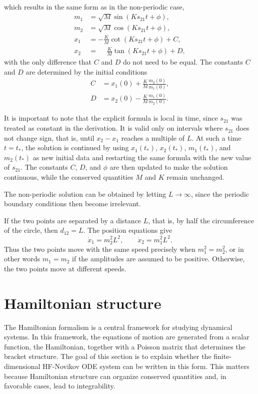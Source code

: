 \documentclass[english,master]{liumaiex}
\theoremstyle{thesisplain}
\theoremstyle{thesisdefinition}
\numberwithin{equation}{section}
\begin{document}
which results in the same form as in the non-periodic case,
\begin{align}
    m_1 &= \sqrt{M} \sin(K s_{21}t + \phi), \\
    m_2 &= \sqrt{M} \cos(K s_{21}t + \phi), \\
    x_1 &= -\frac{K}{M}\cot(Ks_{21}t + \phi) + C,\\
    x_2 &= \phantom{-}\frac{K}{M}\tan(Ks_{21}t + \phi) + D,
\end{align}
with the only difference that $C$ and $D$ do not need to be equal. The constants $C$ and $D$ are determined by the initial conditions
\begin{equation}
\begin{aligned}
    C &= x_1(0) + \frac{K}{M}\frac{m_2(0)}{m_1(0)}, \\
    D &= x_2(0) - \frac{K}{M}\frac{m_1(0)}{m_2(0)}.
\end{aligned}
\end{equation}

It is important to note that the explicit formula is local in time, since $s_{21}$ was treated as constant in the derivation. It is valid only on intervals where $s_{21}$ does not change sign, that is, until $x_2-x_1$ reaches a multiple of $L$. At such a time $t=t_*$, the solution is continued by using $x_1(t_*)$, $x_2(t_*)$, $m_1(t_*)$, and $m_2(t_*)$ as new initial data and restarting the same formula with the new value of $s_{21}$. The constants $C$, $D$, and $\phi$ are then updated to make the solution continuous, while the conserved quantities $M$ and $K$ remain unchanged.

The non-periodic solution can be obtained by letting $L \rightarrow \infty$, since the periodic boundary conditions then become irrelevant.

If the two points are separated by a distance $L$, that is, by half the circumference of the circle, then $d_{12}=L$. The position equations give
\begin{equation}
    \dot{x}_1 = m_2^2L^2, \qquad
    \dot{x}_2 = m_1^2L^2.
\end{equation}
Thus the two points move with the same speed precisely when $m_1^2=m_2^2$, or in other words $m_1=m_2$ if the amplitudes are assumed to be positive. Otherwise, the two points move at different speeds.

\section{Hamiltonian structure} \label{sec:Hamiltonian}
The Hamiltonian formalism is a central framework for studying dynamical systems. In this framework, the equations of motion are generated from a scalar function, the Hamiltonian, together with a Poisson matrix that determines the bracket structure. The goal of this section is to explain whether the finite-dimensional HF-Novikov ODE system can be written in this form. This matters because Hamiltonian structure can organize conserved quantities and, in favorable cases, lead to integrability.
\end{document}
